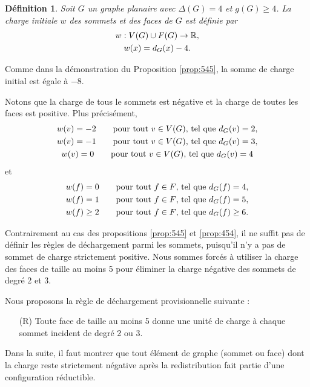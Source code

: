 \documentclass[10pt,a4paper]{article}
\newtheorem{definition}{Définition}
\begin{document}
\begin{definition}
Soit $G$ un graphe planaire avec $\Delta(G)=4$ et $g(G)\ge 4$.
La charge initiale $w$ des sommets et des faces de $G$ est définie par
$$
\gathered
w: V(G)\cup F(G) \to \mathbb{R}, \\
w(x) = d_G(x) - 4. \\
\endgathered
$$
\end{definition}

Comme dans la démonstration du Proposition \ref{prop:545}, la somme de charge initial est égale à $-8$.

Notons que la charge de tous le sommets est négative et la charge de toutes les faces est positive. Plus précisément, 
$$
\gathered
w(v) = -2 \qquad \textrm{pour tout $v \in V(G)$, tel que  } d_G(v) = 2,\\
w(v) = -1 \qquad \textrm{pour tout $v \in V(G)$, tel que  } d_G(v) = 3,\\
w(v) = 0 \qquad \textrm{pour tout $v \in V(G)$, tel que  } d_G(v) = 4
\endgathered
$$
et
$$
\gathered
w(f) = 0 \qquad \textrm{pour tout $f \in F$, tel que  } d_G(f) = 4,\\
w(f) = 1 \qquad \textrm{pour tout $f \in F$, tel que  } d_G(f) = 5,\\
w(f) \geq 2 \qquad \textrm{pour tout $f \in F$, tel que  } d_G(f) \geq 6.
\endgathered
$$


Contrairement au cas des propositions \ref{prop:545} et \ref{prop:454}, il ne suffit pas de définir les règles de déchargement parmi les sommets, puisqu'il n'y a pas de sommet de charge strictement positive. Nous sommes forcés à utiliser la charge des faces de taille au moins 5 pour éliminer la charge négative des sommets de degré 2 et 3.

Nous proposons la règle de déchargement provisionnelle suivante :

\begin{enumerate}
\item [(R)] Toute face de taille au moins 5 donne une unité de charge à chaque sommet incident de degré 2 ou 3.
\end{enumerate}

Dans la suite, il faut montrer que tout élément de graphe (sommet ou face) dont la charge reste strictement négative après la redistribution fait partie d'une configuration réductible.
\end{document}
